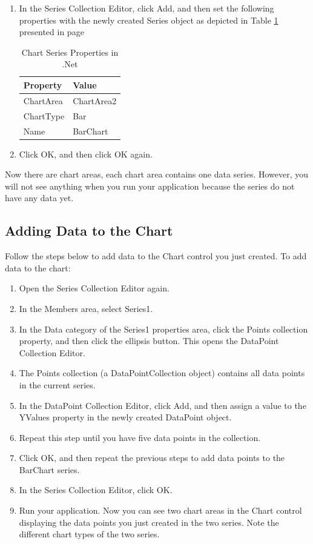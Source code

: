 \documentclass[12pt,a4paper,final,twoside,titlepage]{book}
\begin{document}
\begin{enumerate}
\item In the Series Collection Editor, click Add, and then set the following properties with the newly created Series object as depicted in Table \ref{SeriesProperties} presented in page \pageref{SeriesProperties}
\begin{table}
\begin{center}
\caption{Chart Series Properties in .Net}
\begin{tabular}{|l|l|}
\hline Property & Value \\
\hline ChartArea & ChartArea2 \\
\hline ChartType & Bar \\
\hline Name & BarChart \\
\hline
\end{tabular}
\end{center}
\label{SeriesProperties}
\end{table}
\item Click OK, and then click OK again.
\end{enumerate}
Now there are chart areas, each chart area contains one data series. However, you will not see anything when you run your application because the series do not have any data yet.
\subsection{Adding Data to the Chart}
Follow the steps below to add data to the Chart control you just created.
To add data to the chart:
\begin{enumerate}
\item Open the Series Collection Editor again.
\item In the Members area, select Series1.
\item In the Data category of the Series1 properties area, click the Points collection property, and then click the ellipsis button. This opens the DataPoint Collection Editor.
\item The Points collection (a DataPointCollection object) contains all data points in the current series.
\item In the DataPoint Collection Editor, click Add, and then assign a value to the YValues property in the newly created DataPoint object.
\item Repeat this step until you have five data points in the collection.
\item Click OK, and then repeat the previous steps to add data points to the BarChart series.
\item In the Series Collection Editor, click OK.
\item Run your application.
Now you can see two chart areas in the Chart control displaying the data points you just created in the two series. Note the different chart types of the two series.
\end{enumerate}
\end{document}

